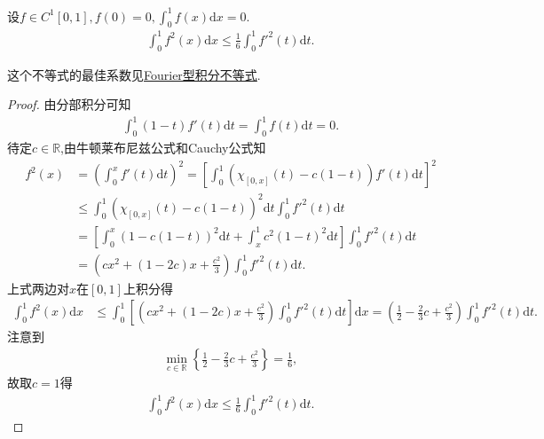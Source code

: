 \documentclass[../../main.tex]{subfiles}%
\begin{document}
\begin{example}
设$f\in C^1[0,1],f(0)=0,\int_0^1 f(x)\mathrm{d}x=0.$
\begin{align*}
\int_0^1 f^2(x)\mathrm{d}x\leqslant\frac{1}{6}\int_0^1 f'^2(t)\mathrm{d}t.
\end{align*}
\end{example}
\begin{remark}
这个不等式的最佳系数见\hyperref[theorem:Fourier型积分不等式]{Fourier型积分不等式}.
\end{remark}
\begin{proof}
由分部积分可知
\begin{align*}
\int_0^1 (1-t)f'(t)\mathrm{d}t=\int_0^1 f(t)\mathrm{d}t=0.
\end{align*}
待定$c\in\mathbb{R}$,由牛顿莱布尼兹公式和Cauchy公式知
\begin{align*}
f^2(x)&=\left( \int_0^x f'(t)\mathrm{d}t \right) ^2=\left[ \int_0^1 \left( \chi_{[0,x]}(t)-c(1-t) \right) f'(t)\mathrm{d}t \right] ^2\\
&\leqslant \int_0^1 \left( \chi_{[0,x]}(t)-c(1-t) \right) ^2\mathrm{d}t\int_0^1 f'^2(t)\mathrm{d}t\\
&=\left[ \int_0^x \left( 1-c(1-t) \right) ^2\mathrm{d}t+\int_x^1 c^2(1-t)^2\mathrm{d}t \right] \int_0^1 f'^2(t)\mathrm{d}t\\
&=\left( cx^2+(1-2c)x+\frac{c^2}{3} \right) \int_0^1 f'^2(t)\mathrm{d}t.
\end{align*}
上式两边对$x$在$[0,1]$上积分得
\begin{align*}
\int_0^1 f^2(x)\mathrm{d}x&\leqslant \int_0^1 \left[ \left( cx^2+(1-2c)x+\frac{c^2}{3} \right) \int_0^1 f'^2(t)\mathrm{d}t \right] \mathrm{d}x=\left( \frac{1}{2}-\frac{2}{3}c+\frac{c^2}{3} \right) \int_0^1 f'^2(t)\mathrm{d}t.
\end{align*}
注意到
\begin{align*}
\min\limits_{c\in\mathbb{R}}\left\{ \frac{1}{2}-\frac{2}{3}c+\frac{c^2}{3} \right\} =\frac{1}{6},
\end{align*}
故取$c=1$得
\begin{align*}
\int_0^1 f^2(x)\mathrm{d}x\leqslant\frac{1}{6}\int_0^1 f'^2(t)\mathrm{d}t.
\end{align*}
\end{proof}
\end{document}
